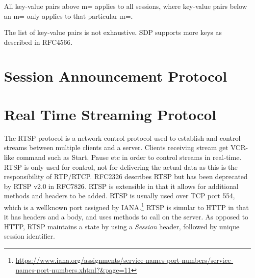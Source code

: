 All key-value pairs above m= applies to all sessions, where key-value pairs below an m= only applies to that particular m=. 

The list of key-value pairs is not exhaustive. SDP supports more keys as described in RFC4566.


\section{Session Announcement Protocol} \label{sec:design:sap}
\section{Real Time Streaming Protocol} \label{sec:design:rtsp}
The RTSP protocol is a network control protocol used to establish and control streams between multiple clients and a server. Clients receiving stream get \ac{VCR}-like command such as Start, Pause etc in order to control streams in real-time. RTSP is only used for control, not for delivering the actual data as this is the responsibility of RTP/RTCP.
RFC2326 describes RTSP but has been deprecated by RTSP v2.0 in RFC7826. RTSP is extensible in that it allows for additional methods and headers to be added.
RTSP is usually used over TCP port 554, which is a wellknown port assigned by IANA.\footnote{\url{https://www.iana.org/assignments/service-names-port-numbers/service-names-port-numbers.xhtml?&page=11}} RTSP is simular to HTTP in that it has headers and a body, and uses methods to call on the server. As opposed to HTTP, RTSP maintains a state by using a \textit{Session} header, followed by unique session identifier.

